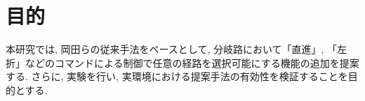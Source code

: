 
\section{目的}
本研究では, 岡田らの従来手法をベースとして, 分岐路において「直進」, 「左折」などのコマンドによる制御で任意の経路を選択可能にする機能の追加を提案する. さらに, 実験を行い, 実環境における提案手法の有効性を検証することを目的とする.


